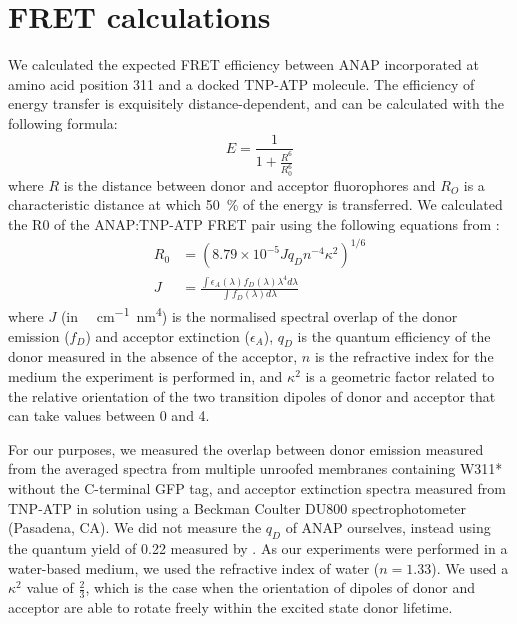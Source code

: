 \section{FRET calculations}
We calculated the expected FRET efficiency between ANAP incorporated at amino acid position 311 and a docked TNP-ATP molecule.
The efficiency of energy transfer is exquisitely distance-dependent, and can be calculated with the following formula:
\begin{equation} \label{eq:forster_fret}
E = \frac{1}{1 + \frac{R^6}{R_0^6}}
\end{equation}
where $R$ is the distance between donor and acceptor fluorophores and $R_O$ is a characteristic distance at which \SI{50}{\percent} of the energy is transferred.
We calculated the R0 of the ANAP:TNP-ATP FRET pair using the following equations from \citeauthor{selvin_13_1995}:
\begin{equation} \label{eq:selvin_fret}
\begin{split}
R_0 &= (8.79 \times 10^{-5} J q_D n^{-4} \kappa^2)^{1/6}\\
J &= \frac{\int \epsilon_A (\lambda) f_D (\lambda) \lambda^4 d \lambda}{\int f_D (\lambda) d \lambda}
\end{split}
\end{equation}
where $J$ (in \si{\per\Molar\per\centi\metre\nano\metre}\textsuperscript{4}) is the normalised spectral overlap of the donor emission ($f_D$) and acceptor extinction ($\epsilon_A$), $q_D$ is the quantum efficiency of the donor measured in the absence of the acceptor, $n$ is the refractive index for the medium the experiment is performed in, and $\kappa^2$ is a geometric factor related to the relative orientation of the two transition dipoles of donor and acceptor that can take values between 0 and 4.

For our purposes, we measured the overlap between donor emission measured from the averaged spectra from multiple unroofed membranes containing W311* without the C-terminal GFP tag, and acceptor extinction spectra measured from TNP-ATP in solution using a Beckman Coulter DU800 spectrophotometer (Pasadena, CA).
We did not measure the $q_D$ of ANAP ourselves, instead using the quantum yield of 0.22 measured by \citeauthor{zagotta_measuring_2016}.
As our experiments were performed in a water-based medium, we used the refractive index of water ($n = 1.33$).
We used a $\kappa^2$ value of $\frac{2}{3}$, which is the case when the orientation of dipoles of donor and acceptor are able to rotate freely within the excited state donor lifetime.

